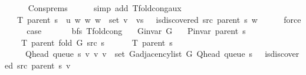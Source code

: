 \begin{isabellebody}
\ \ \ \ \isamarkupfalse%
\ Cons{\isachardot}{\kern0pt}prems\isanewline
\ \ \ \ \isamarkupfalse%
\ {\isacharparenleft}{\kern0pt}simp\ add{\isacharcolon}{\kern0pt}\ T{\isacharunderscore}{\kern0pt}fold{\isacharunderscore}{\kern0pt}cong{\isacharunderscore}{\kern0pt}aux{\isacharparenright}{\kern0pt}\isanewline
\ \ \isamarkupfalse%
\ \isamarkupfalse%
\ {\isachardoublequoteopen}{\isachardot}{\kern0pt}{\isachardot}{\kern0pt}{\isachardot}{\kern0pt}\ {\isacharequal}{\kern0pt}\ T\ {\isacharparenleft}{\kern0pt}parent\ s{\isacharparenright}{\kern0pt}\ {\isasymunion}\ {\isacharbraceleft}{\kern0pt}{\isacharparenleft}{\kern0pt}u{\isacharcomma}{\kern0pt}\ w{\isacharparenright}{\kern0pt}\ {\isacharbar}{\kern0pt}w{\isachardot}{\kern0pt}\ w\ {\isasymin}\ set\ {\isacharparenleft}{\kern0pt}v\ {\isacharhash}{\kern0pt}\ vs{\isacharparenright}{\kern0pt}\ {\isasymand}\ {\isasymnot}\ is{\isacharunderscore}{\kern0pt}discovered\ src\ {\isacharparenleft}{\kern0pt}parent\ s{\isacharparenright}{\kern0pt}\ w{\isacharbraceright}{\kern0pt}{\isachardoublequoteclose}\isanewline
\ \ \ \ \isamarkupfalse%
\ force\isanewline
\ \ \isamarkupfalse%
\ \isamarkupfalse%
\ {\isacharquery}{\kern0pt}case\isanewline
\ \ \ \ \isacommand{{\isachardot}{\kern0pt}}\isamarkupfalse%
\isanewline
{}\isamarkupfalse%
%
\endisatagproof
{\isafoldproof}%
%
\isadelimproof
\isanewline
%
\endisadelimproof
\isanewline
{}\isamarkupfalse%
\ {\isacharparenleft}{\kern0pt}\ bfs{\isacharparenright}{\kern0pt}\ T{\isacharunderscore}{\kern0pt}fold{\isacharunderscore}{\kern0pt}cong{\isacharunderscore}{\kern0pt}{}{\isacharcolon}{\kern0pt}\isanewline
\ \ \ {\isachardoublequoteopen}G{\isachardot}{\kern0pt}invar\ G{\isachardoublequoteclose}\isanewline
\ \ \ {\isachardoublequoteopen}P{\isacharunderscore}{\kern0pt}invar\ {\isacharparenleft}{\kern0pt}parent\ s{\isacharparenright}{\kern0pt}{\isachardoublequoteclose}\isanewline
\ \ \isanewline
\ \ \ \ {\isachardoublequoteopen}T\ {\isacharparenleft}{\kern0pt}parent\ {\isacharparenleft}{\kern0pt}fold\ G\ src\ s{\isacharparenright}{\kern0pt}{\isacharparenright}{\kern0pt}\ {\isacharequal}{\kern0pt}\isanewline
\ \ \ \ \ T\ {\isacharparenleft}{\kern0pt}parent\ s{\isacharparenright}{\kern0pt}\ {\isasymunion}\isanewline
\ \ \ \ \ {\isacharbraceleft}{\kern0pt}{\isacharparenleft}{\kern0pt}Q{\isacharunderscore}{\kern0pt}head\ {\isacharparenleft}{\kern0pt}queue\ s{\isacharparenright}{\kern0pt}{\isacharcomma}{\kern0pt}\ v{\isacharparenright}{\kern0pt}\ {\isacharbar}{\kern0pt}v{\isachardot}{\kern0pt}\ v\ {\isasymin}\ set\ {\isacharparenleft}{\kern0pt}G{\isachardot}{\kern0pt}adjacency{\isacharunderscore}{\kern0pt}list\ G\ {\isacharparenleft}{\kern0pt}Q{\isacharunderscore}{\kern0pt}head\ {\isacharparenleft}{\kern0pt}queue\ s{\isacharparenright}{\kern0pt}{\isacharparenright}{\kern0pt}{\isacharparenright}{\kern0pt}\ {\isasymand}\ {\isasymnot}\ is{\isacharunderscore}{\kern0pt}discovered\ src\ {\isacharparenleft}{\kern0pt}parent\ s{\isacharparenright}{\kern0pt}\ v{\isacharbraceright}{\kern0pt}{\isachardoublequoteclose}\isanewline

\end{isabellebody}
